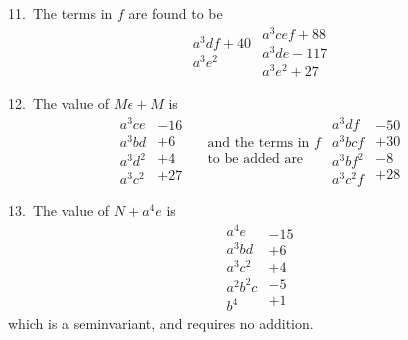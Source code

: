 \documentclass[11pt,a4paper]{article}
\theoremstyle{plain}
\theoremstyle{definition}
\theoremstyle{remark}
\begin{document}
11.\ The terms in $f$ are found to be
\[
\begin{array}{c}
a^3df+40\\
a^3e^2
\end{array}
\begin{array}{c}
a^3cef+88\\
a^3de-117\\
a^3e^2+27
\end{array}
\]

\newpage
\setcounter{page}{304}

12.\ The value of $M\epsilon + M$ is
\[
\begin{array}{c}
a^3ce\\
a^3bd\\
a^3d^2\\
a^3c^2
\end{array}
\begin{array}{r}
-16\\
+6\\
+4\\
+27
\end{array}
\begin{array}{c}
\quad\text{and the terms in }f\\
\quad\text{to be added are}
\end{array}
\begin{array}{c}
a^3df\\
a^3bcf\\
a^3bf^2\\
a^3c^2f
\end{array}
\begin{array}{r}
-50\\
+30\\
-8\\
+28
\end{array}
\]

13.\ The value of $N+a^4e$ is
\[
\begin{array}{c}
a^4e\\
a^3bd\\
a^3c^2\\
a^2b^2c\\
b^4
\end{array}
\begin{array}{r}
-15\\
+6\\
+4\\
-5\\
+1
\end{array}
\]
which is a seminvariant, and requires no addition.
\end{document}
